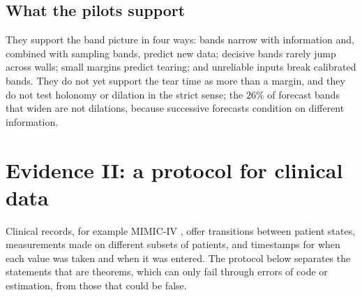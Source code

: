 \documentclass[11pt]{article}
\theoremstyle{definition}
\theoremstyle{remark}
\begin{document}
\subsection{What the pilots support}

They support the band picture in four ways: bands narrow with information and, combined with sampling bands, predict new data;
decisive bands rarely jump across walls; small margins predict tearing; and unreliable inputs break calibrated bands. They do
not yet support the tear time as more than a margin, and they do not test holonomy or dilation in the strict sense; the $26\%$ of
forecast bands that widen are not dilations, because successive forecasts condition on different information.

\section{Evidence II: a protocol for clinical data}\label{sec:protocol}

Clinical records, for example MIMIC-IV \cite{MIMICIV}, offer transitions between patient states, measurements made on different
subsets of patients, and timestamps for when each value was taken and when it was entered. The protocol below separates the
statements that are theorems, which can only fail through errors of code or estimation, from those that could be false.
\end{document}
